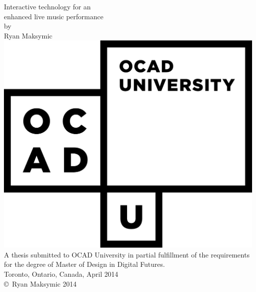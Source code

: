 \begin{titlepage}

\begin{center}

\LARGE{Interactive technology for an\\
enhanced live music performance}\\[0.5cm]
\large{by\\[0.5cm]
Ryan Maksymic
\vfill
\includegraphics[scale=0.3]{ocadu_logo.png}\\[2cm]
A thesis submitted to OCAD University in partial fulfillment of 
the requirements for the degree of Master of Design in Digital Futures.\\[1cm]
Toronto, Ontario, Canada, April 2014\\[1cm]
\copyright\ Ryan Maksymic 2014}
\end{center}

\end{titlepage}